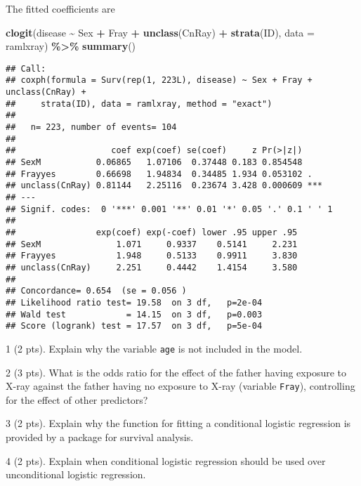 \documentclass[
]{article}
\newenvironment{Shaded}{\begin{snugshade}}{\end{snugshade}}
\newcommand{\AttributeTok}[1]{\textcolor[rgb]{0.13,0.29,0.53}{#1}}
\newcommand{\FunctionTok}[1]{\textcolor[rgb]{0.13,0.29,0.53}{\textbf{#1}}}
\newcommand{\NormalTok}[1]{#1}
\newcommand{\SpecialCharTok}[1]{\textcolor[rgb]{0.81,0.36,0.00}{\textbf{#1}}}
\begin{document}
The fitted coefficients are

\begin{Shaded}
\begin{Highlighting}[]
\FunctionTok{clogit}\NormalTok{(disease }\SpecialCharTok{\textasciitilde{}}\NormalTok{ Sex }\SpecialCharTok{+}\NormalTok{ Fray }\SpecialCharTok{+} \FunctionTok{unclass}\NormalTok{(CnRay) }\SpecialCharTok{+} \FunctionTok{strata}\NormalTok{(ID), }\AttributeTok{data =}\NormalTok{ ramlxray) }\SpecialCharTok{\%\textgreater{}\%}
  \FunctionTok{summary}\NormalTok{()}
\end{Highlighting}
\end{Shaded}

\begin{verbatim}
## Call:
## coxph(formula = Surv(rep(1, 223L), disease) ~ Sex + Fray + unclass(CnRay) + 
##     strata(ID), data = ramlxray, method = "exact")
## 
##   n= 223, number of events= 104 
## 
##                   coef exp(coef) se(coef)     z Pr(>|z|)    
## SexM           0.06865   1.07106  0.37448 0.183 0.854548    
## Frayyes        0.66698   1.94834  0.34485 1.934 0.053102 .  
## unclass(CnRay) 0.81144   2.25116  0.23674 3.428 0.000609 ***
## ---
## Signif. codes:  0 '***' 0.001 '**' 0.01 '*' 0.05 '.' 0.1 ' ' 1
## 
##                exp(coef) exp(-coef) lower .95 upper .95
## SexM               1.071     0.9337    0.5141     2.231
## Frayyes            1.948     0.5133    0.9911     3.830
## unclass(CnRay)     2.251     0.4442    1.4154     3.580
## 
## Concordance= 0.654  (se = 0.056 )
## Likelihood ratio test= 19.58  on 3 df,   p=2e-04
## Wald test            = 14.15  on 3 df,   p=0.003
## Score (logrank) test = 17.57  on 3 df,   p=5e-04
\end{verbatim}

\newpage

1 (2 pts). Explain why the variable \texttt{age} is not included in the
model.

2 (3 pts). What is the odds ratio for the effect of the father having
exposure to X-ray against the father having no exposure to X-ray
(variable \texttt{Fray}), controlling for the effect of other
predictors?

3 (2 pts). Explain why the function for fitting a conditional logistic
regression is provided by a package for survival analysis.

4 (2 pts). Explain when conditional logistic regression should be used
over unconditional logistic regression.

\newpage
\end{document}

